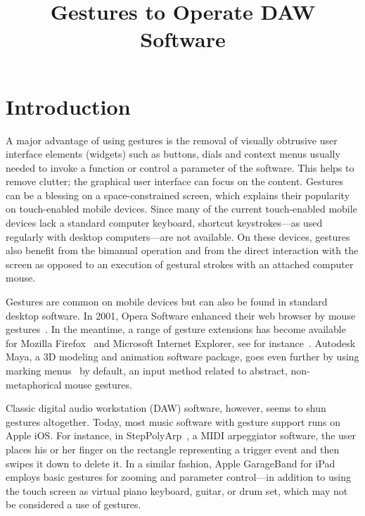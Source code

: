 \documentclass{aes130}
\affiliation[1]{Universit\"{a}t Oldenburg, D-26111-Oldenburg, Germany}
\affiliation[2]{Fachhochschule Bielefeld (University of Applied Sciences), D-33602-Bielefeld, Germany}
\title{Gestures to Operate DAW Software}
\begin{document}
\maketitle

\section{Introduction}

A major advantage of using gestures is the removal of visually obtrusive user interface elements (widgets) such as buttons, dials and context menus usually needed to invoke a function or control a parameter of the software. This helps to remove clutter; the graphical user interface can focus on the content. Gestures can be a blessing on a space-constrained screen, which explains their popularity on touch-enabled mobile devices. Since many of the current touch-enabled mobile devices lack a standard computer keyboard, shortcut keystrokes---as used regularly with desktop computers---are not available. On these devices, gestures also benefit from the bimanual operation and from the direct interaction with the screen as opposed to an execution of gestural strokes with an attached computer mouse.

Gestures are common on mobile devices but can also be found in standard desktop software. In 2001, Opera Software enhanced their web browser by mouse gestures~\cite{OperaGestures}. In the meantime, a range of gesture extensions has become available for Mozilla Firefox~\cite{FirefoxGestureExtensions} and Microsoft Internet Explorer, see for instance~\cite{InternetExplorerGestures}. Autodesk Maya, a 3D modeling and animation software package, goes even further by using marking menus~\cite{Kurtenbach:1994:ULP:259963.260376} by default, an input method related to abstract, non-metaphorical mouse gestures.

Classic digital audio workstation (DAW) software, however, seems to shun gestures altogether. Today, most music software with gesture support runs on Apple iOS. For instance, in StepPolyArp~\cite{StepPolyArp}, a MIDI arpeggiator software, the user places his or her finger on the rectangle representing a trigger event and then swipes it down to delete it. In a similar fashion, Apple GarageBand for iPad~\cite{garage} employs basic gestures for zooming and parameter control---in addition to using the touch screen as virtual piano keyboard, guitar, or drum set, which may not be considered a use of gestures.

\end{document}
